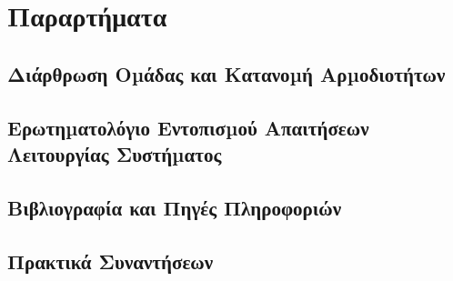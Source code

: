 \section{Παραρτήματα}
		
	\subsection{Διάρθρωση Οµάδας και Κατανοµή Αρµοδιοτήτων}
	\subsection{Ερωτηµατολόγιο Εντοπισµού Απαιτήσεων Λειτουργίας Συστήµατος}
	\subsection{Βιβλιογραφία και Πηγές Πληροφοριών}
	\subsection{Πρακτικά Συναντήσεων}
